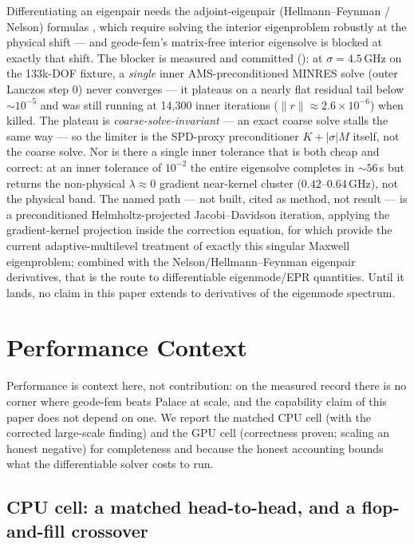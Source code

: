 \documentclass{anvil-paper}
\begin{document}
Differentiating an eigenpair needs the adjoint-eigenpair
(Hellmann--Feynman / Nelson) formulas
\citep{nelson1976simplified}, which require solving the interior
eigenproblem robustly at the physical shift --- and geode-fem's
matrix-free interior eigensolve is blocked at exactly that shift. The
blocker is measured and committed
():
at $\sigma = 4.5$\,GHz on the 133k-DOF fixture, a \emph{single} inner
AMS-preconditioned MINRES solve (outer Lanczos step 0) never converges
--- it plateaus on a nearly flat residual tail below ${\sim}10^{-5}$ and
was still running at 14{,}300 inner iterations ($\lVert r\rVert \approx
2.6\times10^{-6}$) when killed. The plateau is
\emph{coarse-solve-invariant} --- an exact coarse solve stalls the same
way --- so the limiter is the SPD-proxy preconditioner $K + |\sigma|M$
itself, not the coarse solve. Nor is there a single inner tolerance that
is both cheap and correct: at an inner tolerance of $10^{-2}$ the entire
eigensolve completes in ${\sim}56$\,s but returns the non-physical
$\lambda \approx 0$ gradient near-kernel cluster ($0.42$--$0.64$\,GHz),
not the physical band. The named path --- not built, cited as method,
not result --- is a preconditioned Helmholtz-projected Jacobi--Davidson
iteration, applying the gradient-kernel projection inside the correction
equation, for which \citet{liang2026adaptive} provide the current
adaptive-multilevel treatment of exactly this singular Maxwell
eigenproblem; combined with the Nelson/Hellmann--Feynman eigenpair
derivatives, that is the route to differentiable eigenmode/EPR
quantities. Until it lands, no claim in this paper extends to
derivatives of the eigenmode spectrum.

\section{Performance Context}
\label{sec:perf}

Performance is context here, not contribution: on the measured record
there is no corner where geode-fem beats Palace at scale, and the
capability claim of this paper does not depend on one. We report the
matched CPU cell (with the corrected large-scale finding) and the GPU
cell (correctness proven; scaling an honest negative) for completeness
and because the honest accounting bounds what the differentiable solver
costs to run.

\subsection{CPU cell: a matched head-to-head, and a flop-and-fill
crossover}
\label{sec:perf-cpu}
\end{document}
